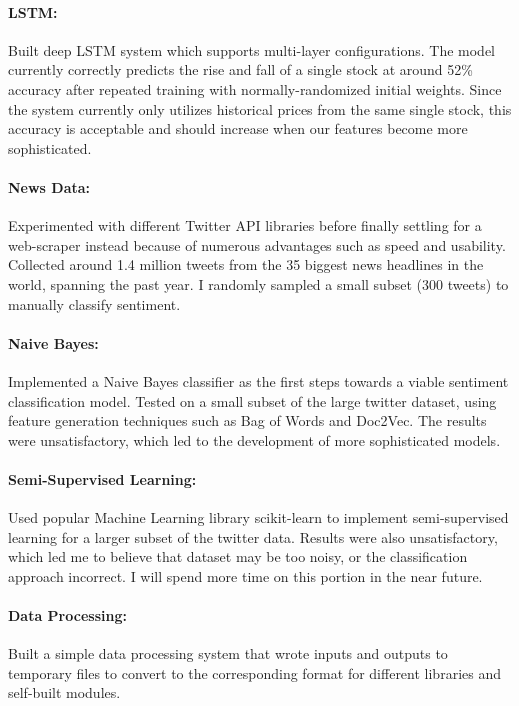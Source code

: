 \documentclass[12pt]{article}
\begin{document}
\paragraph{LSTM:}
Built deep LSTM system which supports multi-layer configurations. The
model currently correctly predicts the rise and fall of a single stock 
at around 52\% accuracy after repeated training with normally-randomized 
initial weights. Since the system currently only utilizes historical
prices from the same single stock, this accuracy is acceptable and
should increase when our features become more sophisticated.

\paragraph{News Data:}
Experimented with different Twitter API libraries before finally settling
for a web-scraper instead because of numerous advantages such as speed
and usability. Collected around 1.4 million tweets from the 35 biggest
news headlines in the world, spanning the past year. I randomly sampled
a small subset (300 tweets) to manually classify sentiment.

\paragraph{Naive Bayes:}
Implemented a Naive Bayes classifier as the first steps towards
a viable sentiment classification model. Tested on a small subset
of the large twitter dataset, using feature generation techniques
such as Bag of Words and Doc2Vec. The results were unsatisfactory,
which led to the development of more sophisticated models.

\paragraph{Semi-Supervised Learning:}
Used popular Machine Learning library scikit-learn to implement
semi-supervised learning for a larger subset of the twitter data.
Results were also unsatisfactory, which led me to believe that dataset
may be too noisy, or the classification approach incorrect. I will spend
more time on this portion in the near future.

\paragraph{Data Processing:}
Built a simple data processing system that wrote inputs and outputs to
temporary files to convert to the corresponding format for different
libraries and self-built modules.\\
\end{document}
